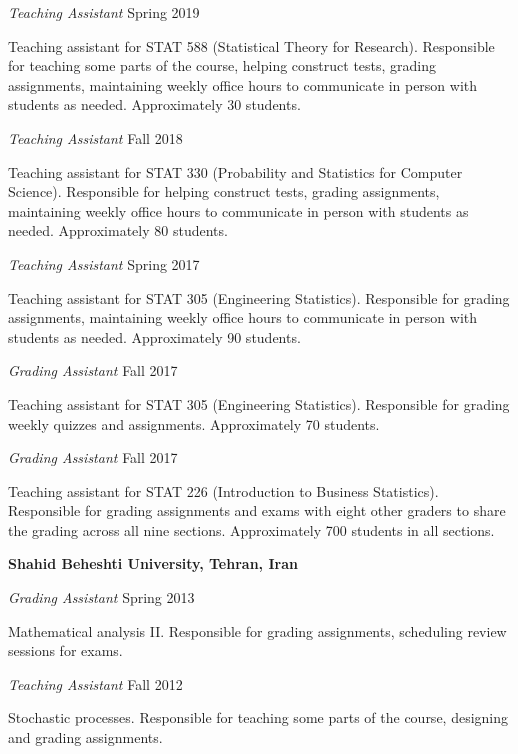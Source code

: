 \documentclass[margin,line]{res}
\begin{document}
\begin{resume}
{\em Teaching Assistant} \hfill { Spring 2019}

\vspace{-.3cm}
Teaching assistant for STAT 588 (Statistical Theory for Research). Responsible for teaching some parts of the course, helping construct tests, grading assignments, maintaining weekly office hours to communicate in person with students as needed. Approximately 30 students.

{\em Teaching Assistant} \hfill { Fall 2018}

\vspace{-.3cm}
Teaching assistant for STAT 330 (Probability and Statistics for Computer Science). Responsible for  helping construct tests, grading assignments, maintaining weekly office hours to communicate in person with students as needed. Approximately 80 students.

{\em Teaching Assistant} \hfill { Spring 2017}

\vspace{-.3cm}
Teaching assistant for STAT 305  (Engineering Statistics). Responsible for grading assignments, maintaining weekly office hours to communicate in person with students as needed. Approximately 90 students.

{\em Grading Assistant} \hfill { Fall 2017}

\vspace{-.3cm}
Teaching assistant for STAT 305  (Engineering Statistics). Responsible for grading weekly quizzes and assignments. Approximately 70 students.

{\em Grading Assistant} \hfill { Fall 2017}

\vspace{-.3cm}
Teaching assistant for STAT 226  (Introduction to Business Statistics). Responsible for grading assignments and exams with eight other graders to share the grading across all nine sections. Approximately 700 students in all sections.


{\bf Shahid Beheshti University, Tehran, Iran}

{\em Grading Assistant} \hfill { Spring 2013}

\vspace{-.3cm}
Mathematical analysis II. Responsible for grading assignments, scheduling review sessions for exams. 

{\em Teaching Assistant} \hfill { Fall 2012}

\vspace{-.3cm}
Stochastic processes. Responsible for teaching some parts of the course, designing and grading assignments. 


\end{resume}
\end{document}
